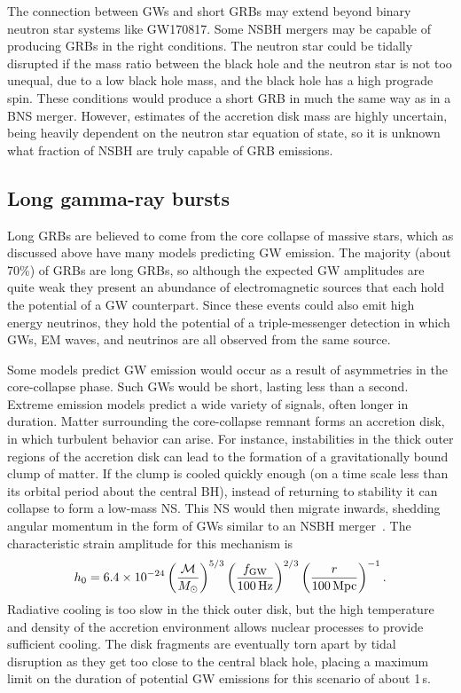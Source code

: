 The connection between GWs and short GRBs may extend beyond binary neutron star systems like GW170817.
Some \ac{NSBH} mergers may be capable of producing GRBs in the right conditions.
The neutron star could be tidally disrupted if the mass ratio between the black hole and the neutron star is not too unequal, due to a low black hole mass, and the black hole has a high prograde spin.
These conditions would produce a short GRB in much the same way as in a \ac{BNS} merger.
However, estimates of the accretion disk mass are highly uncertain, being heavily dependent on the neutron star equation of state, so it is unknown what fraction of NSBH are truly capable of GRB emissions.


\subsection{Long gamma-ray bursts}\label{sec:gw-grb-long}

Long GRBs are believed to come from the core collapse of massive stars, which as discussed above have many models predicting GW emission.
The majority (about 70\%) of GRBs are long GRBs, so although the expected GW amplitudes are quite weak they present an abundance of electromagnetic sources that each hold the potential of a GW counterpart.
Since these events could also emit high energy neutrinos, they hold the potential of a triple-messenger detection in which GWs, EM waves, and neutrinos are all observed from the same source.

Some models predict GW emission would occur as a result of asymmetries in the core-collapse phase.
Such \acp{GW} would be short, lasting less than a second.
Extreme emission models predict a wide variety of signals, often longer in duration.
Matter surrounding the core-collapse remnant forms an accretion disk, in which turbulent behavior can arise.
For instance, instabilities in the thick outer regions of the accretion disk can lead to the formation of a gravitationally bound clump of matter.
If the clump is cooled quickly enough (on a time scale less than its orbital period about the central BH), instead of returning to stability it can collapse to form a low-mass NS.
This NS would then migrate inwards, shedding angular momentum in the form of GWs similar to an NSBH merger~\citep{Piro_2007}.
The characteristic strain amplitude for this mechanism is
\begin{equation}
	h_0 = 6.4 \times 10^{-24} \left( \frac{\mathcal{M}}{M_{\odot}} \right)^{5/3} \left( \frac{f_{\mathrm{GW}}}{100\,\mathrm{Hz}} \right)^{2/3} \left( \frac{r}{100\,\mathrm{Mpc}} \right)^{-1}.
\end{equation}
Radiative cooling is too slow in the thick outer disk, but the high temperature and density of the accretion environment allows nuclear processes to provide sufficient cooling.
The disk fragments are eventually torn apart by tidal disruption as they get too close to the central black hole, placing a maximum limit on the duration of potential GW emissions for this scenario of about 1\,s.


